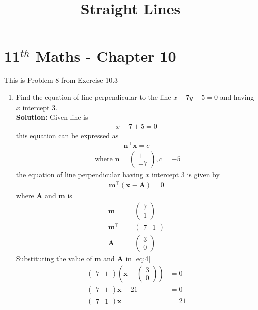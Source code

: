 \documentclass[12pt]{article}
\providecommand{\brak}[1]{\ensuremath{\left(#1\right)}}
\newcommand{\solution}{\noindent \textbf{Solution: }}
\newcommand{\myvec}[1]{\ensuremath{\begin{pmatrix}#1\end{pmatrix}}}
\let\vec\mathbf
\begin{document}
\begin{center}
\title{\textbf{Straight Lines}}
\date{\vspace{-5ex}} %
\maketitle
\end{center}
\setcounter{page}{1}
\section*{11$^{th}$ Maths - Chapter 10}
This is Problem-8 from Exercise 10.3
\begin{enumerate}
	\item Find the equation of line perpendicular to the line $x-7y+5=0$ and having $x$ intercept $3$.\\
\solution
Given line is 
\begin{align}
	x-7+5=0
\end{align}
this equation can be expressed as 
\begin{align}
	\vec{n}^{\top}\vec{x}=c
\end{align}
\begin{align}
	\text{ where }
		\vec{n} = \myvec{1\\-7} , c = -5
\end{align}
the equation of line perpendicular having $x$ intercept $3$ is given by 
\begin{align}
	\vec{m}^\top\brak{\vec{x}-\vec{A}}=0 \label{eq:4}
\end{align}
		where $\vec{A}$ and $\vec{m}$ is 
\begin{align}
	\vec{m} &=\myvec{7\\1}\\
	\vec{m}^\top &=\myvec{7 & 1}\\
	\vec{A} &=\myvec{3\\0}
\end{align}
		Substituting the value of $\vec{m}$ and $\vec{A}$ in \eqref{eq:4}
		\begin{align}
			\myvec{7 & 1}\brak{\vec{x}-\myvec{3\\0}} &=0\\
			\myvec{7 & 1}\vec{x}-21 &=0\\
			\myvec{7 & 1}\vec{x} &= 21
		\end{align}
\begin{figure}[!h]
\begin{center}

\end{center}
\end{figure}
\end{enumerate}
\end{document}
